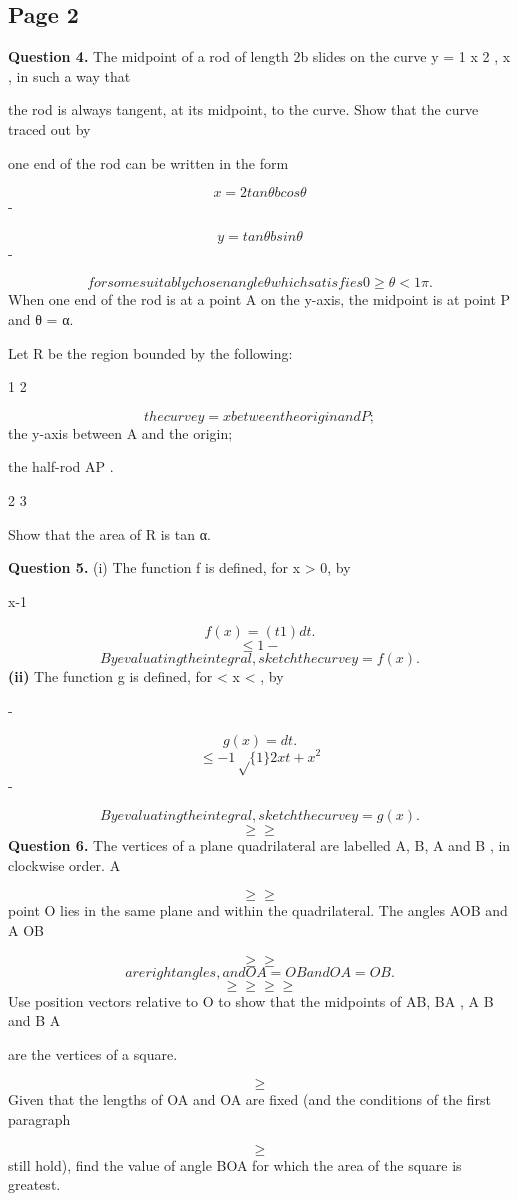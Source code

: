 \documentclass[12pt]{article}
\begin{document}
\subsection*{Page 2}
\begin{flushleft}
\bigskip\textbf{Question 4.} The midpoint of a rod of length 2b slides on the curve y = 1 x 2 , x , in such a way that\par
the rod is always tangent, at its midpoint, to the curve. Show that the curve traced out by\par
one end of the rod can be written in the form\par
\[x = 2 tan θ b cos θ\]
-\par
\[y = tan θ b sin θ\]
-\par
\[for some suitably chosen angle θ which satisfies 0 \geq θ < 1 \pi .\]
When one end of the rod is at a point A on the y-axis, the midpoint is at point P and θ = α.\par
Let R be the region bounded by the following:\par
1 2\par
\[the curve y = x between the origin and P ;\]
the y-axis between A and the origin;\par
the half-rod AP .\par
2 3\par
Show that the area of R is tan α.\par
\bigskip\textbf{Question 5.} (i) The function f is defined, for x > 0, by\par
x-1\par
\[f(x) = (t 1) dt .\]
\[\leq 1 -\]
\[By evaluating the integral, sketch the curve y = f(x).\]
\textbf{(ii)} The function g is defined, for < x < , by\par
-\infty \infty\par
\[g(x) = dt .\]
\[\leq -1 \sqrt\{1\} 2xt + x^2\]
-\par
\[By evaluating the integral, sketch the curve y = g(x).\]
\[\geq \geq\]
\bigskip\textbf{Question 6.} The vertices of a plane quadrilateral are labelled A, B, A and B , in clockwise order. A\par
\[\geq \geq\]
point O lies in the same plane and within the quadrilateral. The angles AOB and A OB\par
\[\geq \geq\]
\[are right angles, and OA = OB and OA = OB .\]
\[\geq \geq \geq \geq\]
Use position vectors relative to O to show that the midpoints of AB, BA , A B and B A\par
are the vertices of a square.\par
\[\geq\]
Given that the lengths of OA and OA are fixed (and the conditions of the first paragraph\par
\[\geq\]
still hold), find the value of angle BOA for which the area of the square is greatest.\par
\end{flushleft}
\end{document}
